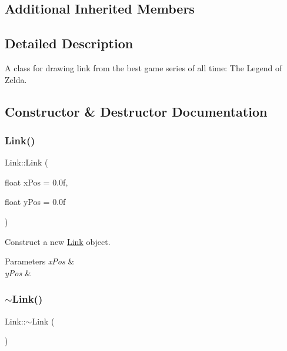 \subsection*{Additional Inherited Members}


\subsection{Detailed Description}
A class for drawing link from the best game series of all time\+: The Legend of Zelda. 



\subsection{Constructor \& Destructor Documentation}
\mbox{\label{classLink_ab709f50a45a23296e9e78baf5bb75c67}} 
\subsubsection{\texorpdfstring{Link()}{Link()}}
{\footnotesize\ttfamily Link\+::\+Link (\begin{DoxyParamCaption}\item[{float}]{x\+Pos = {\ttfamily 0.0f},  }\item[{float}]{y\+Pos = {\ttfamily 0.0f} }\end{DoxyParamCaption})}



Construct a new \mbox{\hyperlink{classLink}{Link}} object. 


\begin{DoxyParams}{Parameters}
{\em x\+Pos} & \\
\hline
{\em y\+Pos} & \\
\hline
\end{DoxyParams}
\mbox{\label{classLink_a7be82ff147159742ad26febff8a9439b}} 
\subsubsection{\texorpdfstring{$\sim$Link()}{~Link()}}
{\footnotesize\ttfamily Link\+::$\sim$\+Link (\begin{DoxyParamCaption}{ }\end{DoxyParamCaption})\hspace{0.3cm}{\ttfamily [default]}}



